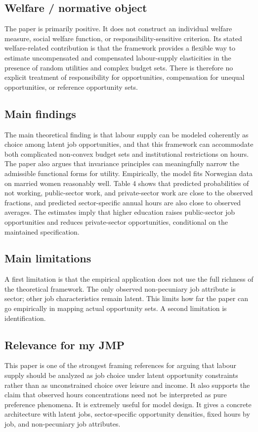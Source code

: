 \documentclass[11pt,a4paper]{article}
\begin{document}
\subsection*{Welfare / normative object}
The paper is primarily positive. It does not construct an individual welfare measure, social welfare function, or responsibility-sensitive criterion. Its stated welfare-related contribution is that the framework provides a flexible way to estimate uncompensated and compensated labour-supply elasticities in the presence of random utilities and complex budget sets. There is therefore no explicit treatment of responsibility for opportunities, compensation for unequal opportunities, or reference opportunity sets.

\subsection*{Main findings}
The main theoretical finding is that labour supply can be modeled coherently as choice among latent job opportunities, and that this framework can accommodate both complicated non-convex budget sets and institutional restrictions on hours. The paper also argues that invariance principles can meaningfully narrow the admissible functional forms for utility. Empirically, the model fits Norwegian data on married women reasonably well. Table 4 shows that predicted probabilities of not working, public-sector work, and private-sector work are close to the observed fractions, and predicted sector-specific annual hours are also close to observed averages. The estimates imply that higher education raises public-sector job opportunities and reduces private-sector opportunities, conditional on the maintained specification.

\subsection*{Main limitations}
A first limitation is that the empirical application does not use the full richness of the theoretical framework. The only observed non-pecuniary job attribute is sector; other job characteristics remain latent. This limits how far the paper can go empirically in mapping actual opportunity sets. A second limitation is identification.

\subsection*{Relevance for my JMP}
This paper is one of the strongest framing references for arguing that labour supply should be analyzed as job choice under latent opportunity constraints rather than as unconstrained choice over leisure and income. It also supports the claim that observed hours concentrations need not be interpreted as pure preference phenomena. It is extremely useful for model design. It gives a concrete architecture with latent jobs, sector-specific opportunity densities, fixed hours by job, and non-pecuniary job attributes.
\end{document}

